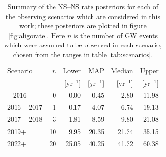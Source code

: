 \documentclass[twocolumn]{aastex61}
\newcommand{\yr}{\mathrm{yr}}
\newcommand{\BNS}{\ac{NS}--\ac{NS}\xspace}
\begin{document}
\begin{table}
\begin{center}
  \begin{tabular}{lrrrrr}
    \toprule
    Scenario &    $n$ & Lower       & MAP             & Median          & Upper\\
             &        & [$\yr^{-1}$] & [$\yr^{-1}$]    & [$\yr^{-1}$]    & [$\yr^{-1}$]  \\
    \colrule
    2015 -- 2016 & 0   & 0.00	 & 0.45	 & 2.80	 & 11.98	\\
    2016 -- 2017 & 1   & 0.17	 & 4.07	 & 6.74	 & 19.13	\\
    2017 -- 2018 & 3   & 1.81	 & 8.59	 & 9.80	 & 21.08	\\
    2019+        & 10  & 9.95 	 & 20.35	 & 21.34	 & 35.15	\\
    2022+        & 20  & 25.05	 & 40.25	 & 41.32	 & 60.38	\\
    \botrule
\end{tabular}
\end{center}

\caption{Summary of the \BNS rate posteriors for each of the observing
  scenarios which are considered in this work; these posteriors are plotted
  in figure \ref{fig:aligorate}. Here $n$ is the number of \ac{GW} events which were assumed to be observed in each scenario, chosen from the ranges in table \ref{tab:scenarios}.
  \label{tab:rateposteriors}
}
\end{table}
\end{document}
